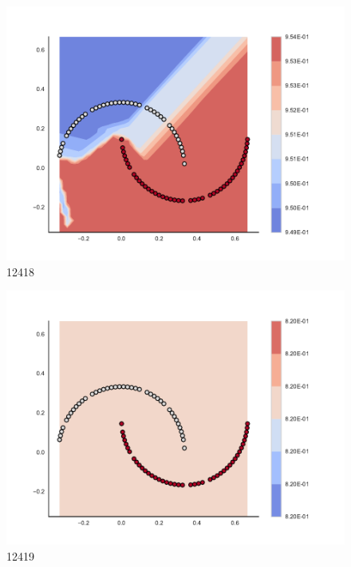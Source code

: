 \begin{subfigure}[b]{0.09\textwidth}
    \includegraphics[clip, trim=2.35cm 1.75cm 4.5cm 0cm,width=\textwidth]{img/convergence/12418.pdf}
    \caption{12418}
    \label{fig:convergence_12418}
\end{subfigure}
%
\begin{subfigure}[b]{0.09\textwidth}
    \includegraphics[clip, trim=2.35cm 1.75cm 4.5cm 0cm,width=\textwidth]{img/convergence/12419.pdf}
    \caption{12419}
    \label{fig:convergence_12419}
\end{subfigure}
%
